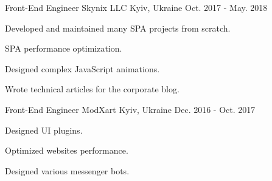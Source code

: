 \begin{cventries}
  \cventry
    {Front-End Engineer} %
    {Skynix LLC} %
    {Kyiv, Ukraine} %
    {Oct. 2017 - May. 2018} %
    {
      \begin{cvitems} %
        \item {Developed and maintained many SPA projects from scratch.}
        \item {SPA performance optimization.}
        \item {Designed complex JavaScript animations.}
        \item {Wrote technical articles for the corporate blog.}
      \end{cvitems}
    }

  \cventry
    {Front-End Engineer} %
    {ModXart} %
    {Kyiv, Ukraine} %
    {Dec. 2016 - Oct. 2017} %
    {
      \begin{cvitems} %
        \item {Designed UI plugins.}
        \item {Optimized websites performance.}
        \item {Designed various messenger bots.}
      \end{cvitems}
    }
\end{cventries}
